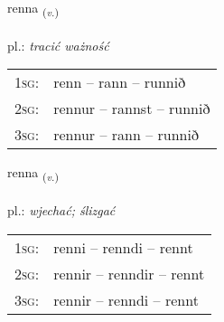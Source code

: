 \documentclass[frontgrid, backgrid]{flacards}\usepackage[]{graphicx}\usepackage[]{xcolor}
\begin{document}
\renewcommand{\flhead}{\vskip5pt \fboxsep=0pt {\small\bfseries\footnotesize Sagnorð | czasownik}}
\renewcommand{\fcfoot}{\vskip5pt \fboxsep=0pt \hspace{2pt}{\small\bfseries\footnotesize 1K}}

\renewcommand{\blhead}{\vskip5pt {\small\bfseries\footnotesize Sagnorð | czasownik }}
\renewcommand{\bcfoot}{\vskip5pt \hspace{2pt}{\small\bfseries\footnotesize 1K}}


{renna \small{\textsubscript{(\textit{v.})}} \\[1ex] %
\textphonetic{[rɛna]} \\
pl.: \emph{tracić ważność} \\  [2ex]
\renewcommand*{\arraystretch}{0.8}
\begin{tabular}{p{1cm}l}
\textsc{1sg}: & renn -- rann -- runnið \\ 
\textsc{2sg}: & rennur -- rannst -- runnið \\ 
\textsc{3sg}: & rennur -- rann -- runnið \\ 
\end{tabular}
}

\renewcommand{\flhead}{\vskip5pt \fboxsep=0pt {\small\bfseries\footnotesize Sagnorð | czasownik}}
\renewcommand{\fcfoot}{\vskip5pt \fboxsep=0pt \hspace{2pt}{\small\bfseries\footnotesize 1K}}

\renewcommand{\blhead}{\vskip5pt {\small\bfseries\footnotesize Sagnorð | czasownik }}
\renewcommand{\bcfoot}{\vskip5pt \hspace{2pt}{\small\bfseries\footnotesize 1K}}


{renna \small{\textsubscript{(\textit{v.})}} \\[1ex] %
\textphonetic{[rɛna]} \\
pl.: \emph{wjechać; ślizgać} \\  [2ex]
\renewcommand*{\arraystretch}{0.8}
\begin{tabular}{p{1cm}l}
\textsc{1sg}: & renni -- renndi -- rennt \\ 
\textsc{2sg}: & rennir -- renndir -- rennt \\ 
\textsc{3sg}: & rennir -- renndi -- rennt \\ 
\end{tabular}
}
\end{document}
